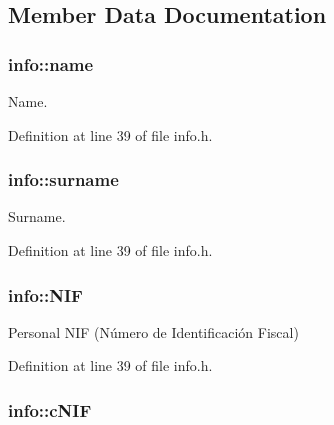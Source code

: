 \subsection{Member Data Documentation}
\hypertarget{structinfo_a27cfacf228447e06d83abd01882eb78d}{
\subsubsection[{name}]{\setlength{\rightskip}{0pt plus 5cm}info\+::name}}\label{structinfo_a27cfacf228447e06d83abd01882eb78d}


Name. 



Definition at line 39 of file info.\+h.

\hypertarget{structinfo_a9dd9f00d6b74f1d7b4519e509efd0031}{
\subsubsection[{surname}]{\setlength{\rightskip}{0pt plus 5cm}info\+::surname}}\label{structinfo_a9dd9f00d6b74f1d7b4519e509efd0031}


Surname. 



Definition at line 39 of file info.\+h.

\hypertarget{structinfo_a68e2c3e3e7e8e6df17e1f5b466506319}{
\subsubsection[{N\+I\+F}]{\setlength{\rightskip}{0pt plus 5cm}info\+::\+N\+I\+F}}\label{structinfo_a68e2c3e3e7e8e6df17e1f5b466506319}


Personal N\+I\+F (Número de Identificación Fiscal) 



Definition at line 39 of file info.\+h.

\hypertarget{structinfo_a46ee4d6a7e5976d795ed9efa02341fce}{
\subsubsection[{c\+N\+I\+F}]{\setlength{\rightskip}{0pt plus 5cm}info\+::c\+N\+I\+F}}\label{structinfo_a46ee4d6a7e5976d795ed9efa02341fce}


